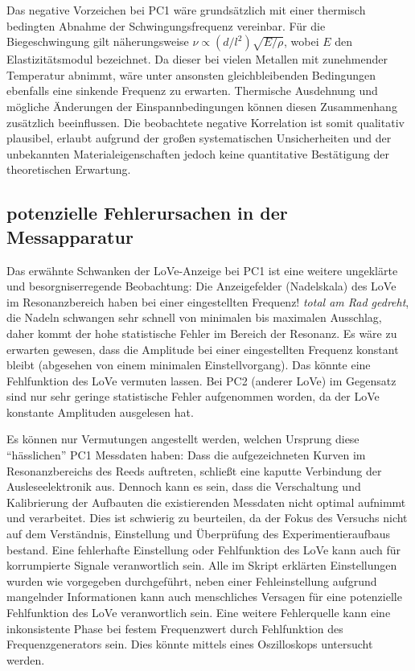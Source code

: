 \documentclass[11pt,a4paper]{article}
\begin{document}
Das negative Vorzeichen bei PC1 wäre grundsätzlich mit einer thermisch bedingten Abnahme der Schwingungsfrequenz vereinbar. Für die Biegeschwingung gilt näherungsweise $\nu\propto(d/l^2)\sqrt{E/\rho}$, wobei $E$ den Elastizitätsmodul bezeichnet. Da dieser bei vielen Metallen mit zunehmender Temperatur abnimmt, wäre unter ansonsten gleichbleibenden Bedingungen ebenfalls eine sinkende Frequenz zu erwarten. Thermische Ausdehnung und mögliche Änderungen der Einspannbedingungen können diesen Zusammenhang zusätzlich beeinflussen. Die beobachtete negative Korrelation ist somit qualitativ plausibel, erlaubt aufgrund der großen systematischen Unsicherheiten und der unbekannten Materialeigenschaften jedoch keine quantitative Bestätigung der theoretischen Erwartung.

\subsection{potenzielle Fehlerursachen in der Messapparatur}
Das erwähnte Schwanken der LoVe-Anzeige bei PC1 ist eine weitere ungeklärte und besorgniserregende Beobachtung: Die Anzeigefelder (Nadelskala) des LoVe im Resonanzbereich haben bei einer eingestellten Frequenz! \emph{total am Rad gedreht}, die Nadeln schwangen sehr schnell von minimalen bis maximalen Ausschlag, daher kommt der hohe statistische Fehler im Bereich der Resonanz. Es wäre zu erwarten gewesen, dass die Amplitude bei einer eingestellten Frequenz konstant bleibt (abgesehen von einem minimalen Einstellvorgang). Das könnte eine Fehlfunktion des LoVe vermuten lassen. Bei PC2 (anderer LoVe) im Gegensatz sind nur sehr geringe statistische Fehler aufgenommen worden, da der LoVe konstante Amplituden ausgelesen hat.

Es können nur Vermutungen angestellt werden, welchen Ursprung diese \enquote{hässlichen} PC1 Messdaten haben: Dass die aufgezeichneten Kurven im Resonanzbereichs des Reeds auftreten, schließt eine kaputte Verbindung der Ausleseelektronik aus. Dennoch kann es sein, dass die Verschaltung und Kalibrierung der Aufbauten die existierenden Messdaten nicht optimal aufnimmt und verarbeitet. Dies ist schwierig zu beurteilen, da der Fokus des Versuchs nicht auf dem Verständnis, Einstellung und Überprüfung des Experimentieraufbaus bestand. Eine fehlerhafte Einstellung oder Fehlfunktion des LoVe kann auch für korrumpierte Signale veranwortlich sein. Alle im Skript erklärten Einstellungen wurden wie vorgegeben durchgeführt, neben einer Fehleinstellung aufgrund mangelnder Informationen kann auch menschliches Versagen für eine potenzielle Fehlfunktion des LoVe veranwortlich sein. Eine weitere Fehlerquelle kann eine inkonsistente Phase bei festem Frequenzwert durch Fehlfunktion des Frequenzgenerators sein. Dies könnte mittels eines Oszilloskops untersucht werden.
\end{document}
